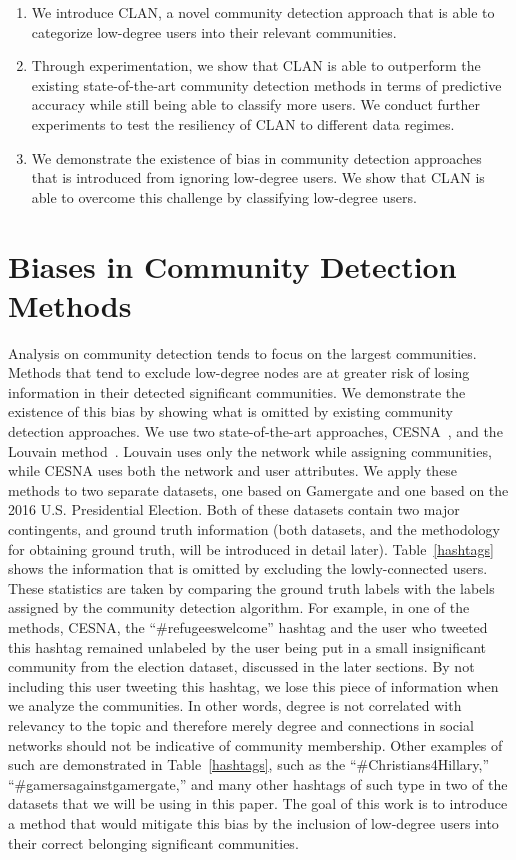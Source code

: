 \begin{enumerate}
\item We introduce CLAN, a novel community detection approach that is able to categorize low-degree users into their relevant communities.
\item Through experimentation, we show that CLAN is able to outperform the existing state-of-the-art community detection methods in terms of predictive accuracy while still being able to classify more users. We conduct further experiments to test the resiliency of CLAN to different data regimes.
\item We demonstrate the existence of bias in community detection approaches that is introduced from ignoring low-degree users. We show that CLAN is able to overcome this challenge by classifying low-degree users. 

\end{enumerate}
\section{Biases in Community Detection Methods}
Analysis on community detection tends to focus on the largest communities. Methods that tend to exclude low-degree nodes are at greater risk of losing information in their detected significant communities. 
We demonstrate the existence of this bias by showing what is omitted by existing community detection approaches. We use two state-of-the-art approaches, CESNA~\cite{6729613}, and the Louvain method~\cite{blondel2008fast}. Louvain uses only the network while assigning communities, while CESNA uses both the network and user attributes. We apply these methods to two separate datasets, one based on Gamergate and one based on the 2016 U.S. Presidential Election. Both of these datasets contain two major contingents, and ground truth information (both datasets, and the methodology for obtaining ground truth, will be introduced in detail later). Table~\ref{hashtags} shows the information that is omitted by excluding the lowly-connected users. These statistics are taken by comparing the ground truth labels with the labels assigned by the community detection algorithm.
For example, in one of the methods, CESNA, %
the ``\#refugeeswelcome'' hashtag and the user who tweeted this hashtag remained unlabeled by the user being put in a small insignificant community from the election dataset, discussed in the later sections. By not including this user tweeting this hashtag, we lose this piece of information when we analyze the communities. In other words, degree is not correlated with relevancy to the topic and therefore merely degree and connections in social networks should not be indicative of community membership. Other examples of such are demonstrated in Table~\ref{hashtags}, such as the ``\#Christians4Hillary,'' ``\#gamersagainstgamergate,'' and many other hashtags of such type in two of the datasets that we will be using in this paper. The goal of this work is to introduce a method that would mitigate this bias by the inclusion of low-degree users into their correct belonging significant communities. 
